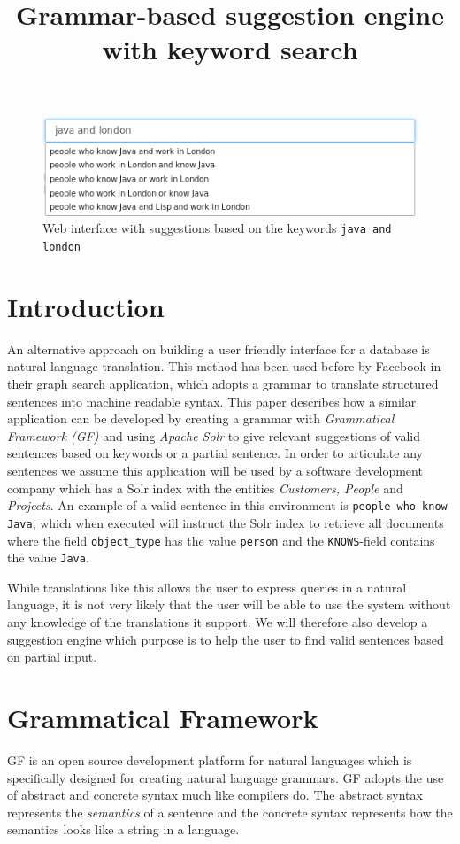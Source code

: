 \documentclass[10pt, a4paper]{article}
\title{Grammar-based suggestion engine with keyword search}
\begin{document}
\maketitleabstract

\begin{figure}[!b]
\centering
\includegraphics[scale=0.99]{./java-london.png}
\caption{Web interface with suggestions based on the keywords \texttt{java and london} \label{figure}}
\end{figure}

\section{Introduction}
An alternative approach on building a user friendly interface for a database is  natural language translation. This method has been used before by Facebook \cite{li:2013} in their graph search application, which adopts a grammar to translate structured sentences into machine readable syntax. This paper describes how a similar application can be developed by creating a grammar with \emph{Grammatical Framework (GF)} \cite{ranta:2011} and using \emph{Apache Solr} \cite{kuc:2011} to give relevant suggestions of valid sentences based on keywords or a partial sentence.
\newline
\newline
In order to articulate any sentences we assume this application will be used by a software development company which has a Solr index with the entities \emph{Customers, People} and \emph{Projects}. An example of a valid sentence in this environment is \texttt{people who know Java}, which when executed will instruct the Solr index to retrieve all documents where the field \texttt{object\_type} has the value \texttt{person} and the \texttt{KNOWS}-field contains the value \texttt{Java}. 

While translations like this allows the user to express queries in a natural language, it is not very likely that the user will be able to use the system without any knowledge of the translations it support. We will therefore also develop a suggestion engine which purpose is to help the user to find valid sentences based on partial input.

\section{Grammatical Framework}
GF is an open source development platform for natural languages which is specifically designed for creating natural language grammars. GF adopts the use of abstract and concrete syntax much like compilers do. The abstract syntax represents the \emph{semantics} of a sentence and the concrete syntax represents how the semantics looks like a string in a language. 
\end{document}
